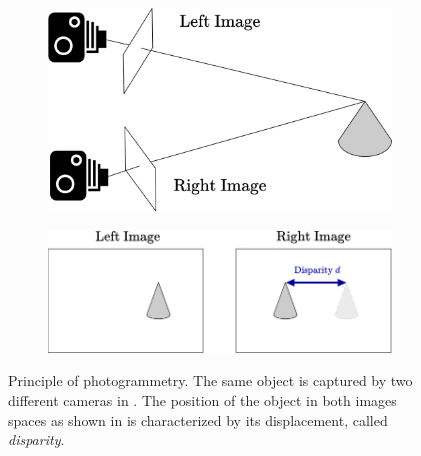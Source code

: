 \begin{figure}
    \begin{subfigure}[t]{0.5\linewidth}
        \flushleft
        \includegraphics[width=0.7\linewidth]{Images/Chap_1/Sterero_principle_1.png}
        \caption{}
        \label{fig:stereo_principle_1}
    \end{subfigure}
    \begin{subfigure}[t]{0.5\linewidth}
        \flushright
        \includegraphics[width=\linewidth]{Images/Chap_1/Sterero_principle_2.png}
        \caption{}
        \label{fig:stereo_principle_2}
    \end{subfigure}
    \caption{Principle of photogrammetry. The same object is captured by two different cameras in . The position of the object in both images spaces as shown in  is characterized by its displacement, called \textit{disparity}.}
    \label{fig:stereo_principle}
\end{figure}

